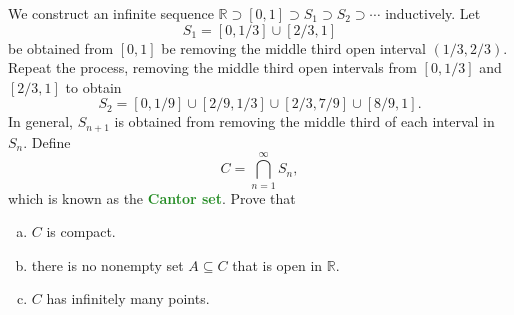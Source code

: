 \documentclass[11pt]{scrartcl}
\providecommand{\RR}{\mathbb R}
\providecommand{\ii}{\item}
\providecommand{\vocab}[1]{{\textbf{\textcolor{ForestGreen}{#1}}}}
\begin{document}
\pagebreak
\begin{problem}
	We construct an infinite sequence
	$\RR\supset[0,1]\supset S_1\supset S_2\supset\cdots$ inductively. Let
	\[S_1 = [0,1/3]\cup[2/3,1]\]
	be obtained from $[0,1]$ be removing the middle third open interval
	$(1/3,2/3)$. Repeat the process, removing the middle third open intervals
	from $[0,1/3]$ and $[2/3,1]$ to obtain
	\[S_2 = [0,1/9]\cup[2/9,1/3]\cup[2/3,7/9]\cup[8/9,1].\]
	In general, $S_{n+1}$ is obtained from removing the middle third
	of each interval in $S_n$. Define
	\[C = \bigcap_{n=1}^\infty S_n,\]
	which is known as the \vocab{Cantor set}. Prove that
	\begin{enumerate}[(a)]
		\ii $C$ is compact.
		\ii there is no nonempty set $A\subseteq C$ that is open in $\RR$.
		\ii $C$ has infinitely many points.
	\end{enumerate}
\end{problem}
\end{document}
